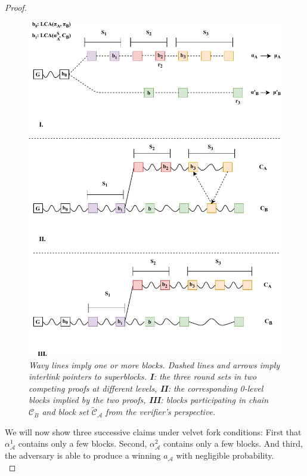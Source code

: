 \begin{proof}
\begin{figure}[h!]
	\begin{center}
    \includegraphics[scale=0.65]{figures/proof_velvet-crop.pdf}
	\end{center}
	\caption{\textit{ Wavy lines imply one or more blocks. Dashed lines and arrows imply interlink pointers to superblocks. \textbf{I}: the three round sets in two competing proofs at different levels, \textbf{II}: the corresponding 0-level blocks implied by the two proofs, \textbf{III}: blocks participating in chain $\mathcal{C}_B$ and block set $\widetilde{\mathcal{C}}_\mathcal{A}$ from the verifier's perspective.}}
    \label{fig:proof_velvet}
\end{figure}

We will now show three successive claims under velvet fork conditions: First that $\alpha_\mathcal{A}^1$ contains only a few blocks. Second,  $\alpha_\mathcal{A}^2$ contains only a few blocks. And third, the adversary is able to produce a winning $a_\mathcal{A}$ with negligible probability.\\


\end{proof}
